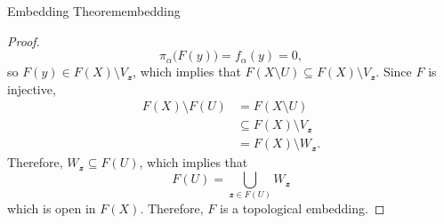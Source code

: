 \documentclass[math]{amznotes}
\theoremstyle{remark}
\begin{document}
\begin{thmbox}{Embedding Theorem}{embedding}
\begin{proof}
\begin{equation*}
            \pi_{\alpha}\bigl(F\left(y\right)\bigr) = f_{\alpha}\left(y\right) = 0,
        \end{equation*}
        so $F\left(y\right) \in F\left(X\right) \setminus V_{\mathbfit{z}}$, which implies that $F\left(X \setminus U\right) \subseteq F\left(X\right) \setminus V_{\mathbfit{z}}$. Since $F$ is injective, 
        \begin{align*}
            F\left(X\right) \setminus F\left(U\right) & = F\left(X \setminus U\right) \\
            & \subseteq F\left(X\right) \setminus V_{\mathbfit{z}} \\
            & = F\left(X\right) \setminus W_{\mathbfit{z}}.
        \end{align*}
        Therefore, $W_{\mathbfit{z}} \subseteq F\left(U\right)$, which implies that 
        \begin{equation*}
            F\left(U\right) = \bigcup_{\mathbfit{z} \in F\left(U\right)}W_{\mathbfit{z}}
        \end{equation*}
        which is open in $F\left(X\right)$. Therefore, $F$ is a topological embedding.
    \end{proof}
\end{thmbox}
\end{document}
